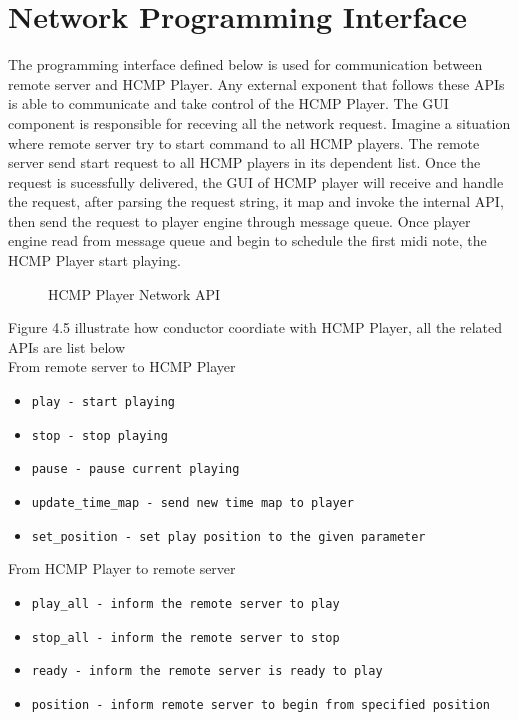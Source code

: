 \section{Network Programming Interface}
The programming interface defined below is used for communication 
between remote server and HCMP Player. Any external exponent that  
follows these APIs is able to communicate and take control of the 
HCMP Player.
The GUI component is responsible for receving all the network request. 
Imagine a situation where remote server   
try to start command to all HCMP players. The remote server send start 
request to all HCMP players in its dependent list.
Once the request is sucessfully delivered, the GUI of HCMP player will 
receive and handle the request, after parsing the request string, 
it map and invoke the internal API, then send the request to player engine 
through message queue. Once player engine read from message queue and
begin to schedule the first midi note, the HCMP Player start playing.

\begin{figure}[H]
\caption{HCMP Player Network API}
\label{fig:speciation}
\end{figure}
Figure 4.5 illustrate how conductor coordiate with HCMP Player, all the  
related APIs are list below \\

From remote server to HCMP Player
\begin{itemize}
  \item \texttt{play - start playing}  
  \item \texttt{stop - stop playing}
  \item \texttt{pause - pause current playing}
  \item \texttt{update\_time\_map - send new time map to player}  
  \item \texttt{set\_position - set play position to the given parameter}
\end{itemize}

From HCMP Player to remote server
\begin{itemize}
  \item \texttt{play\_all - inform the remote server to play}  
  \item \texttt{stop\_all - inform the remote server to stop}  
  \item \texttt{ready - inform the remote server is ready to play}
  \item \texttt{position - inform remote server to begin from specified position}
\end{itemize}
